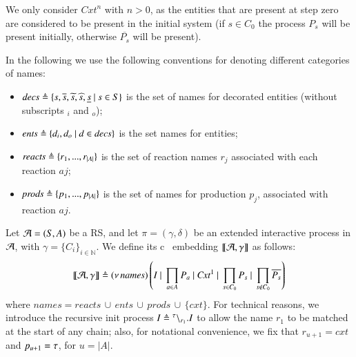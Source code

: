 We only consider $\mathit{Cxt}^n$ with $n >0$, as the entities  that are present at step zero  are considered to be present in the initial system (if $s\in C_0$ the process $P_s$ will be present initially, otherwise $\overline{P_s}$ will be present).

In the following we use the following conventions for denoting different categories of names:
\begin{itemize}
\item
$\mathit{decs} \triangleq \{ s, \overline{s}, \widetilde{s},\widehat{s},\underline{s}~|~ s\in S\}$ is the set of names for decorated entities (without subscripts $_i$ and $_o$);
\item
$\mathit{ents} \triangleq \{ d_i, d_o~|~ d\in \mathit{decs}\}$ is the set names for entities;
\item
$\mathit{reacts}\triangleq \{r_1,...,r_{|A|}\}$ is the set of reaction names $r_j$ associated with each reaction $aj$;
\item 
$\mathit{prods}\triangleq \{p_1,...,p_{|A|}\}$ is the set of names for production $p_j$, associated with  reaction $aj$.
\end{itemize}




\begin{definition}
\label{def:trans}
Let ${\cal A} = (S, A)$ be a RS, and let $\pi=(\gamma,\delta)$ be an extended interactive process in ${\cal A}$, with  $\gamma=\{C_i\}_{i\in\mathbb{N}}$. 
We define its c\CNA~{\color{red} embedding}
$\llbracket{\cal A},\gamma \rrbracket$ as follows: 
$$
\llbracket{\cal A},\gamma \rrbracket 
\triangleq
 (\nu\, \mathit{names})\left(I ~|~ \prod_{a\in A} P_a ~|~  \mathit{Cxt}^1 ~|~\prod_{s\in C_0}P_{s} ~|~ \prod_{s \notin C_0}\overline{P_s}\right)
$$
where $\mathit{names} = \mathit{reacts}\, \cup\, \mathit{ents}\, \cup \, \mathit{prods}\, \cup\, \{cxt\}$. 
For technical reasons, we introduce the {\color{red} recursive} init  process $I \triangleq {}^{\tau} \backslash_{r_1}.I$
to allow the name $r_1$ to be matched at the start of any chain; also, 
for notational convenience, we fix that 
$r_{u+1} = \mathit{cxt}$ and $p_{u+1}=\tau$,  for $u=|A|$.
\end{definition}
 



